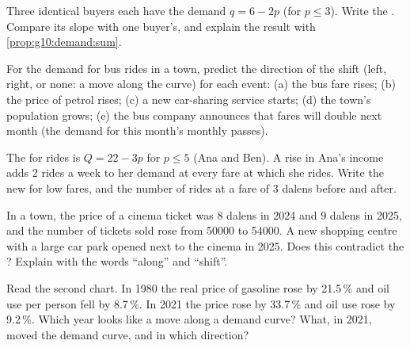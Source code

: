 \begin{exercise}[$\star\star$]\label{exo:g10:demand:7}
Three identical buyers each have the demand $q = 6 - 2p$ (for $p \le 3$). Write the . Compare its slope with one
buyer's, and explain the result with \cref{prop:g10:demand:sum}.
\end{exercise}

\begin{exercise}[$\star\star$]\label{exo:g10:demand:8}
For the demand for bus rides in a town, predict the direction of the shift (left, right, or none: a move along the curve)
for each event: (a) the bus fare rises; (b) the price of petrol rises; (c) a new car-sharing service starts; (d) the town's
population grows; (e) the bus company announces that fares will double next month (the demand for this month's monthly
passes).
\end{exercise}

\begin{exercise}[$\star\star$]\label{exo:g10:demand:9}
The  for rides is $Q = 22 - 3p$ for $p \le 5$ (Ana and Ben). A rise in Ana's income adds 2 rides a week to her
demand at every fare at which she rides. Write the new  for low fares, and the number of rides at a fare of 3
dalens before and after.
\end{exercise}

\begin{exercise}[$\star\star$]\label{exo:g10:demand:10}
In a town, the price of a cinema ticket was 8 dalens in 2024 and 9 dalens in 2025, and the number of tickets sold rose from
\num{50000} to \num{54000}. A new shopping centre with a large car park opened next to the cinema in 2025. Does this
contradict the ? Explain with the words ``along'' and ``shift''.
\end{exercise}

\begin{exercise}[$\star\star$]\label{exo:g10:demand:11}
Read the second chart. In 1980 the real price of gasoline rose by 21.5\,\% and oil use per person fell by 8.7\,\%. In 2021
the price rose by 33.7\,\% and oil use rose by 9.2\,\%. Which year looks like a move along a demand curve? What, in 2021,
moved the demand curve, and in which direction?
\end{exercise}

